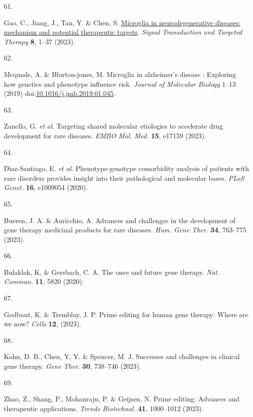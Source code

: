 \documentclass[
]{report}
\newlength{\cslhangindent}
\newlength{\csllabelwidth}
\newenvironment{CSLReferences}[2] %
 {\begin{list}{}{%
  \setlength{\itemindent}{0pt}
  \setlength{\leftmargin}{0pt}
  \setlength{\parsep}{0pt}
  \ifodd #1
   \setlength{\leftmargin}{\cslhangindent}
   \setlength{\itemindent}{-1\cslhangindent}
  \fi
  \setlength{\itemsep}{#2\baselineskip}}}
 {\end{list}}
\newcommand{\CSLLeftMargin}[1]{\parbox[t]{\csllabelwidth}{\strut#1\strut}}
\newcommand{\CSLRightInline}[1]{\parbox[t]{\linewidth - \csllabelwidth}{\strut#1\strut}}
\begin{document}
\begin{CSLReferences}{0}{0}
\CSLLeftMargin{61. }%
\CSLRightInline{Gao, C., Jiang, J., Tan, Y. \& Chen, S.
\href{https://doi.org/10.1038/s41392-023-01588-0}{Microglia in
neurodegenerative diseases: mechanism and potential therapeutic
targets}. \emph{Signal Transduction and Targeted Therapy} \textbf{8},
1--37 (2023).}

\CSLLeftMargin{62. }%
\CSLRightInline{Mcquade, A. \& Blurton-jones, M. Microglia in
alzheimer's disease : Exploring how genetics and phenotype influence
risk. \emph{Journal of Molecular Biology} 1--13 (2019)
doi:\href{https://doi.org/10.1016/j.jmb.2019.01.045}{10.1016/j.jmb.2019.01.045}.}

\CSLLeftMargin{63. }%
\CSLRightInline{Zanello, G. \emph{et al.} Targeting shared molecular
etiologies to accelerate drug development for rare diseases. \emph{EMBO
Mol. Med.} \textbf{15}, e17159 (2023).}

\CSLLeftMargin{64. }%
\CSLRightInline{Dı́az-Santiago, E. \emph{et al.} Phenotype-genotype
comorbidity analysis of patients with rare disorders provides insight
into their pathological and molecular bases. \emph{PLoS Genet.}
\textbf{16}, e1009054 (2020).}

\CSLLeftMargin{65. }%
\CSLRightInline{Bueren, J. A. \& Auricchio, A. Advances and challenges
in the development of gene therapy medicinal products for rare diseases.
\emph{Hum. Gene Ther.} \textbf{34}, 763--775 (2023).}

\CSLLeftMargin{66. }%
\CSLRightInline{Bulaklak, K. \& Gersbach, C. A. The once and future gene
therapy. \emph{Nat. Commun.} \textbf{11}, 5820 (2020).}

\CSLLeftMargin{67. }%
\CSLRightInline{Godbout, K. \& Tremblay, J. P. Prime editing for human
gene therapy: Where are we now? \emph{Cells} \textbf{12}, (2023).}

\CSLLeftMargin{68. }%
\CSLRightInline{Kohn, D. B., Chen, Y. Y. \& Spencer, M. J. Successes and
challenges in clinical gene therapy. \emph{Gene Ther.} \textbf{30},
738--746 (2023).}

\CSLLeftMargin{69. }%
\CSLRightInline{Zhao, Z., Shang, P., Mohanraju, P. \& Geijsen, N. Prime
editing: Advances and therapeutic applications. \emph{Trends
Biotechnol.} \textbf{41}, 1000--1012 (2023).}


\end{CSLReferences}
\end{document}
